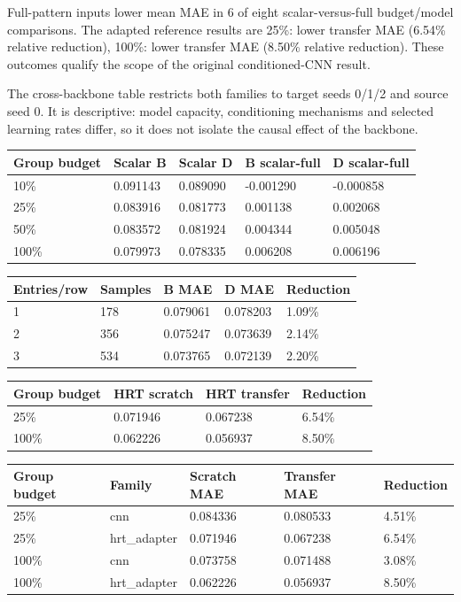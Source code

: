 \documentclass[conference]{IEEEtran}
\begin{document}
Full-pattern inputs lower mean MAE in 6 of eight scalar-versus-full budget/model comparisons. The adapted reference results are 25\%: lower transfer MAE (6.54\% relative reduction), 100\%: lower transfer MAE (8.50\% relative reduction). These outcomes qualify the scope of the original conditioned-CNN result.

The cross-backbone table restricts both families to target seeds 0/1/2 and source seed 0. It is descriptive: model capacity, conditioning mechanisms and selected learning rates differ, so it does not isolate the causal effect of the backbone.

\begin{table}[t]\centering\small
\begin{tabular}{lllll}
\toprule
Group budget & Scalar B & Scalar D & B scalar-full & D scalar-full \\
\midrule
10\% & 0.091143 & 0.089090 & -0.001290 & -0.000858 \\
25\% & 0.083916 & 0.081773 & 0.001138 & 0.002068 \\
50\% & 0.083572 & 0.081924 & 0.004344 & 0.005048 \\
100\% & 0.079973 & 0.078335 & 0.006208 & 0.006196 \\
\bottomrule\end{tabular}\end{table}
\begin{table}[t]\centering\small
\begin{tabular}{lllll}
\toprule
Entries/row & Samples & B MAE & D MAE & Reduction \\
\midrule
1 & 178 & 0.079061 & 0.078203 & 1.09\% \\
2 & 356 & 0.075247 & 0.073639 & 2.14\% \\
3 & 534 & 0.073765 & 0.072139 & 2.20\% \\
\bottomrule\end{tabular}\end{table}
\begin{table}[t]\centering\small
\begin{tabular}{llll}
\toprule
Group budget & HRT scratch & HRT transfer & Reduction \\
\midrule
25\% & 0.071946 & 0.067238 & 6.54\% \\
100\% & 0.062226 & 0.056937 & 8.50\% \\
\bottomrule\end{tabular}\end{table}
\begin{table}[t]\centering\small
\begin{tabular}{lllll}
\toprule
Group budget & Family & Scratch MAE & Transfer MAE & Reduction \\
\midrule
25\% & cnn & 0.084336 & 0.080533 & 4.51\% \\
25\% & hrt\_adapter & 0.071946 & 0.067238 & 6.54\% \\
100\% & cnn & 0.073758 & 0.071488 & 3.08\% \\
100\% & hrt\_adapter & 0.062226 & 0.056937 & 8.50\% \\
\bottomrule\end{tabular}\end{table}
\end{document}
